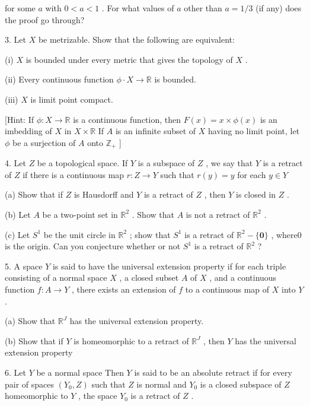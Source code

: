 for some \(a\) with \(0 < a < 1\) . For what values of \(a\) other than \(a = 1/3\) (if any) does the proof go through?

3. Let \(X\) be metrizable. Show that the following are equivalent:

(i) \(X\) is bounded under every metric that gives the topology of \(X\) .

(ii) Every continuous function \(\phi  \cdot  X \rightarrow  \mathbb{R}\) is bounded.

(iii) \(X\) is limit point compact.

[Hint: If \(\phi  : X \rightarrow  \mathbb{R}\) is a continuous function, then \(F\left( x\right)  = x \times  \phi \left( x\right)\) is an imbedding of \(X\) in \(X \times  \mathbb{R}\) If \(A\) is an infinite subset of \(X\) having no limit point, let \(\phi\) be a surjection of \(A\) onto \({\mathbb{Z}}_{ + }\) ]

4. Let \(Z\) be a topological space. If \(Y\) is a subspace of \(Z\) , we say that \(Y\) is a retract of \(Z\) if there is a continuous map \(r : Z \rightarrow  Y\) such that \(r\left( y\right)  = y\) for each \(y \in  Y\)

(a) Show that if \(Z\) is Hausdorff and \(Y\) is a retract of \(Z\) , then \(Y\) is closed in \(Z\) .

(b) Let \(A\) be a two-point set in \({\mathbb{R}}^{2}\) . Show that \(A\) is not a retract of \({\mathbb{R}}^{2}\) .

(c) Let \({S}^{1}\) be the unit circle in \({\mathbb{R}}^{2}\) ; show that \({S}^{1}\) is a retract of \({\mathbb{R}}^{2} - \{ \mathbf{0}\}\) , where0 is the origin. Can you conjecture whether or not \({S}^{1}\) is a retract of \({\mathbb{R}}^{2}\) ?

5. A space \(Y\) is said to have the universal extension property if for each triple consisting of a normal space \(X\) , a closed subset \(A\) of \(X\) , and a continuous function \(f : A \rightarrow  Y\) , there exists an extension of \(f\) to a continuous map of \(X\) into \(Y\) .

(a) Show that \({\mathbb{R}}^{J}\) has the universal extension property.

(b) Show that if \(Y\) is homeomorphic to a retract of \({\mathbb{R}}^{J}\) , then \(Y\) has the universal extension property

6. Let \(Y\) be a normal space Then \(Y\) is said to be an absolute retract if for every pair of spaces \(\left( {{Y}_{0},Z}\right)\) such that \(Z\) is normal and \({Y}_{0}\) is a closed subspace of \(Z\) homeomorphic to \(Y\) , the space \({Y}_{0}\) is a retract of \(Z\) .

